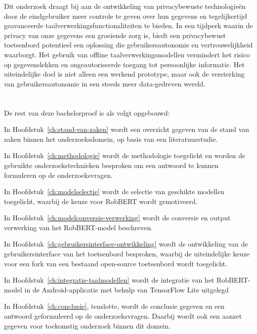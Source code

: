 Dit onderzoek draagt bij aan de ontwikkeling van privacybewuste technologieën door de eindgebruiker meer controle te geven over hun gegevens en tegelijkertijd geavanceerde taalverwerkingsfunctionaliteiten te bieden. In een tijdperk waarin de privacy van onze gegevens een groeiende zorg is, biedt een privacybewust toetsenbord potentieel een oplossing die gebruikersautonomie en vertrouwelijkheid waarborgt. Het gebruik van offline taalverwerkingsmodellen vermindert het risico op gegevenslekken en ongeautoriseerde toegang tot persoonlijke informatie. Het uiteindelijke doel is niet alleen een werkend prototype, maar ook de versterking van gebruikersautonomie in een steeds meer data-gedreven wereld.

\section{}%
\label{sec:opzet-bachelorproef}


De rest van deze bachelorproef is als volgt opgebouwd:

In Hoofdstuk~\ref{ch:stand-van-zaken} wordt een overzicht gegeven van de stand van zaken binnen het onderzoeksdomein, op basis van een literatuurstudie.

In Hoofdstuk~\ref{ch:methodologie} wordt de methodologie toegelicht en worden de gebruikte onderzoekstechnieken besproken om een antwoord te kunnen formuleren op de onderzoeksvragen.

In Hoofdstuk~\ref{ch:modelselectie} wordt de selectie van geschikte modellen toegelicht, waarbij de keuze voor RobBERT wordt gemotiveerd.

In Hoofdstuk~\ref{ch:modelconversie-verwerking} wordt de conversie en output verwerking van het RobBERT-model beschreven.

In Hoofdstuk~\ref{ch:gebruikersinterface-ontwikkeling} wordt de ontwikkeling van de gebruikersinterface van het toetsenbord besproken, waarbij de uiteindelijke keuze voor een fork van een bestaand open-source toetsenbord wordt toegelicht.

In Hoofdstuk~\ref{ch:integratie-taalmodellen} wordt de integratie van het RobBERT-model in de Android-applicatie met behulp van TensorFlow Lite uitgelegd

In Hoofdstuk~\ref{ch:conclusie}, tenslotte, wordt de conclusie gegeven en een antwoord geformuleerd op de onderzoeksvragen. Daarbij wordt ook een aanzet gegeven voor toekomstig onderzoek binnen dit domein.